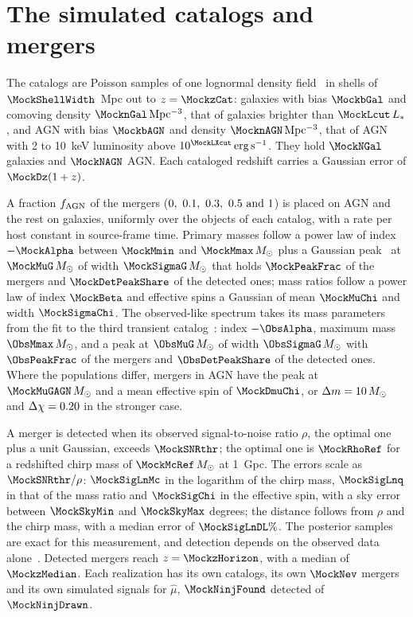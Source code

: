\documentclass[aps,prd,reprint,superscriptaddress,nofootinbib]{revtex4-2}
\newcommand{\Msun}{\,M_\odot}
\newcommand{\fagn}{f_{\rm AGN}}
\newcommand{\dm}{\Delta m}
\newcommand{\dchi}{\Delta\chi}
\begin{document}
\section{The simulated catalogs and mergers}
\label{app:sim}

The catalogs are Poisson samples of one lognormal density
field~\cite{Tessore:2023zyk,Lewis:1999bs} in shells of $\MockShellWidth$~Mpc out to
$z=\MockzCat$: galaxies with bias $\MockbGal$ and comoving density
$\MocknGal\,{\rm Mpc^{-3}}$, that of galaxies brighter than $\MockLcut\,L_*$, and AGN with bias
$\MockbAGN$ and density $\MocknAGN\,{\rm Mpc^{-3}}$, that of AGN with 2 to 10~keV luminosity
above $10^{\MockLXcut}\,{\rm erg\,s^{-1}}$. They hold $\MockNGal$ galaxies and $\MockNAGN$ AGN.
Each cataloged redshift carries a Gaussian error of $\MockDz(1+z)$.

A fraction $\fagn$ of the mergers ($0,\ 0.1,\ 0.3,\ 0.5\ {\rm and}\ 1$) is placed on AGN and the rest on galaxies,
uniformly over the objects of each catalog, with a rate per host constant in source-frame time.
Primary masses follow a power law of index $-\MockAlpha$ between $\MockMmin$ and
$\MockMmax\Msun$ plus a Gaussian peak~\cite{Talbot:2018cva} at $\MockMuG\Msun$ of width
$\MockSigmaG\Msun$ that holds $\MockPeakFrac$ of the mergers and $\MockDetPeakShare$ of the
detected ones; mass ratios follow a power law of index $\MockBeta$ and effective spins a
Gaussian of mean $\MockMuChi$ and width $\MockSigmaChi$. The observed-like spectrum takes its
mass parameters from the fit to the third transient catalog~\cite{KAGRA:2021duu}: index
$-\ObsAlpha$, maximum mass $\ObsMmax\Msun$, and a peak at $\ObsMuG\Msun$ of width
$\ObsSigmaG\Msun$ with $\ObsPeakFrac$ of the mergers and $\ObsDetPeakShare$ of the detected
ones. Where the populations differ, mergers in AGN have the peak at $\MockMuGAGN\Msun$ and a
mean effective spin of $\MockDmuChi$, or $\dm=\IndDmTwice\Msun$ and $\dchi=\IndDchiTwice$ in the
stronger case.

A merger is detected when its observed signal-to-noise ratio $\rho$, the optimal one plus a unit
Gaussian, exceeds $\MockSNRthr$; the optimal one is $\MockRhoRef$ for a redshifted chirp mass of
$\MockMcRef\Msun$ at 1~Gpc. The errors scale as $\MockSNRthr/\rho$: $\MockSigLnMc$ in the
logarithm of the chirp mass, $\MockSigLnq$ in that of the mass ratio and $\MockSigChi$ in the
effective spin, with a sky error between $\MockSkyMin$ and $\MockSkyMax$ degrees; the distance
follows from $\rho$ and the chirp mass, with a median error of $\MockSigLnDL\%$. The posterior
samples are exact for this measurement, and detection depends on the observed data
alone~\cite{Essick:2023upv}. Detected mergers reach $z=\MockzHorizon$, with a median of
$\MockzMedian$. Each realization has its own catalogs, its own $\MockNev$ mergers and its own
simulated signals for $\hat\mu$, $\MockNinjFound$ detected of $\MockNinjDrawn$.
\end{document}
